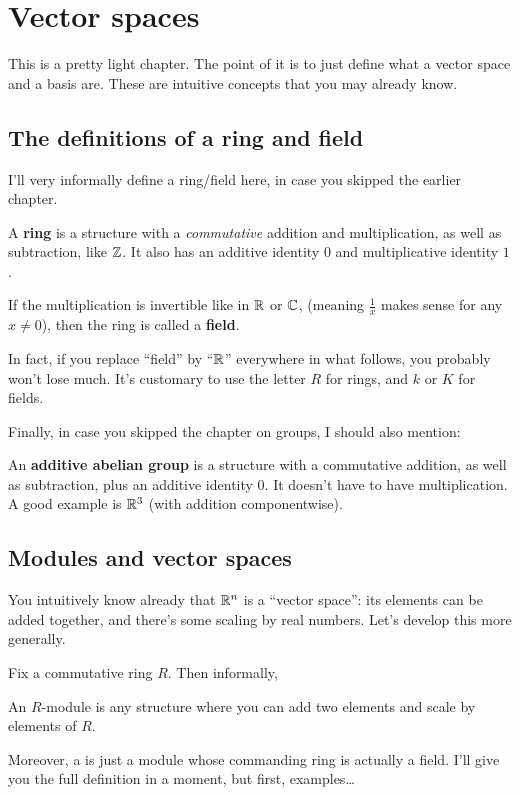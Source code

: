 \chapter{Vector spaces}
This is a pretty light chapter.
The point of it is to just define what a vector space and a basis are.
These are intuitive concepts that you may already know.

\section{The definitions of a ring and field}

I'll very informally define a ring/field here,
in case you skipped the earlier chapter.
\begin{itemize}
	\ii A \textbf{ring} is a structure with a \emph{commutative}
	addition and multiplication, as well as subtraction, like $\mathbb Z$.
	It also has an additive identity $0$ and multiplicative identity $1$.

	\ii If the multiplication is invertible like in $\mathbb R$ or $\mathbb C$,
	(meaning $\frac 1x$ makes sense for any $x \neq 0$),
	then the ring is called a \textbf{field}.
\end{itemize}
In fact, if you replace ``field'' by ``$\mathbb R$'' everywhere in what follows,
you probably won't lose much.
It's customary to use the letter $R$ for rings, and $k$ or $K$ for fields.

Finally, in case you skipped the chapter on groups, I should also mention:
\begin{itemize}
	\ii An \textbf{additive abelian group} is a structure
	with a commutative addition, as well as subtraction,
	plus an additive identity $0$.
	It doesn't have to have multiplication.
	A good example is $\mathbb R^3$ (with addition componentwise).
\end{itemize}

\section{Modules and vector spaces}
You intuitively know already that $\mathbb R^n$ is a ``vector space'':
its elements can be added together,
and there's some scaling by real numbers.
Let's develop this more generally.

Fix a commutative ring $R$.
Then informally,
\begin{moral}
	An $R$-module is any structure where you can add two elements
	and scale by elements of $R$.
\end{moral}
Moreover, a  is just a module whose commanding ring
is actually a field.
I'll give you the full definition in a moment,
but first, examples\dots

